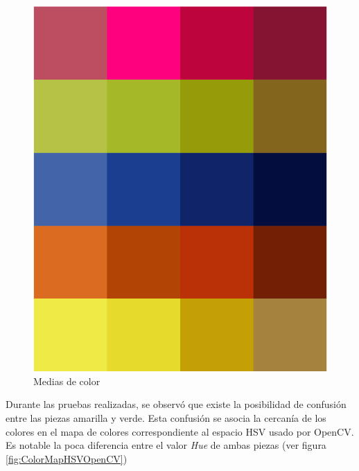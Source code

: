 \begin{figure}[H]
    \centering
    \includegraphics[scale=0.4]{Figures/AllMeans.png}
        \caption{Medias de color}
        \label{fig:AllMeans}
\end{figure}

Durante las pruebas realizadas, se observó que existe la posibilidad de confusión entre las piezas amarilla y verde. Esta confusión se asocia la cercanía de los colores en el mapa de colores correspondiente al espacio HSV usado por OpenCV. Es notable la poca diferencia entre el valor \textit{Hue} de ambas piezas (ver figura \ref{fig:ColorMapHSVOpenCV}) 

